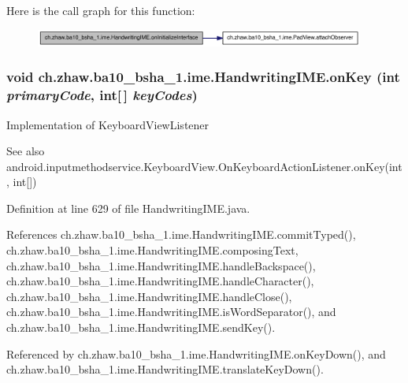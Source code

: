 Here is the call graph for this function:\nopagebreak
\begin{figure}[H]
\begin{center}
\leavevmode
\includegraphics[width=307pt]{classch_1_1zhaw_1_1ba10__bsha__1_1_1ime_1_1HandwritingIME_a113e6d863b481e5a9c926dd917d7822a_cgraph}
\end{center}
\end{figure}
\hypertarget{classch_1_1zhaw_1_1ba10__bsha__1_1_1ime_1_1HandwritingIME_a6bf7a6751794c5bf24f686cbf94d7ebf}{
\subsubsection[{onKey}]{\setlength{\rightskip}{0pt plus 5cm}void ch.zhaw.ba10\_\-bsha\_\-1.ime.HandwritingIME.onKey (int {\em primaryCode}, \/  int\mbox{[}$\,$\mbox{]} {\em keyCodes})}}
\label{classch_1_1zhaw_1_1ba10__bsha__1_1_1ime_1_1HandwritingIME_a6bf7a6751794c5bf24f686cbf94d7ebf}
Implementation of KeyboardViewListener \begin{DoxySeeAlso}{See also}
android.inputmethodservice.KeyboardView.OnKeyboardActionListener.onKey(int, int\mbox{[}\mbox{]}) 
\end{DoxySeeAlso}


Definition at line 629 of file HandwritingIME.java.

References ch.zhaw.ba10\_\-bsha\_\-1.ime.HandwritingIME.commitTyped(), ch.zhaw.ba10\_\-bsha\_\-1.ime.HandwritingIME.composingText, ch.zhaw.ba10\_\-bsha\_\-1.ime.HandwritingIME.handleBackspace(), ch.zhaw.ba10\_\-bsha\_\-1.ime.HandwritingIME.handleCharacter(), ch.zhaw.ba10\_\-bsha\_\-1.ime.HandwritingIME.handleClose(), ch.zhaw.ba10\_\-bsha\_\-1.ime.HandwritingIME.isWordSeparator(), and ch.zhaw.ba10\_\-bsha\_\-1.ime.HandwritingIME.sendKey().

Referenced by ch.zhaw.ba10\_\-bsha\_\-1.ime.HandwritingIME.onKeyDown(), and ch.zhaw.ba10\_\-bsha\_\-1.ime.HandwritingIME.translateKeyDown().

